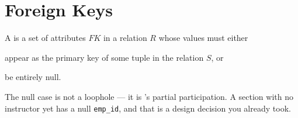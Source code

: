 \section{Foreign Keys}

\begin{definitionbox}
A  is a set of attributes $FK$ in a 
relation $R$ whose values must either
\begin{tight}
  \item appear as the primary key of some tuple in the 
        relation $S$, or
  \item be entirely null.
\end{tight}

\smallskip
The null case is not a loophole --- it is 's partial
participation. A section with no instructor yet has a null \texttt{emp\_id},
and that is a design decision you already took.
\end{definitionbox}


